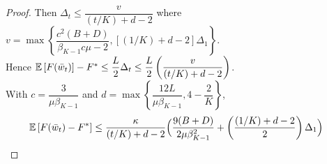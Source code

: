 \begin{proof}
    Then $\Delta_t \leq \dfrac{v}{(t/K) + d - 2}$ %
    where $v = \max \left\{ \dfrac{c^2(B + D)}{\beta_{K - 1} c \mu - 2}, \left[ (1/K) + d - 2 \right] \Delta_1 \right\}$. \\
    Hence $\mathbb{E} \left[ F(\Bar{w}_t) \right] - F^* \leq \dfrac{L}{2}\Delta_t \leq \dfrac{L}{2} \left( \dfrac{v}{(t/K) + d - 2} \right)$. \\
    With $c = \dfrac{3}{\mu \beta_{K - 1}}$ and $d = \max \left\{ \dfrac{12 L}{\mu \beta_{K - 1}}, 4 - \dfrac{2}{K} \right\}$, 
    \begin{align*}
        \mathbb{E} \left[ F(\Bar{w}_t) - F^* \right] & \leq \dfrac{\kappa}{(t/K) + d - 2} \Big( %
        \dfrac{9(B + D)}{2\mu \beta_{K - 1}^2} + \left( \dfrac{(1/K) + d - 2}{2} \right) \Delta_1 \Big)
    \end{align*}
\end{proof}